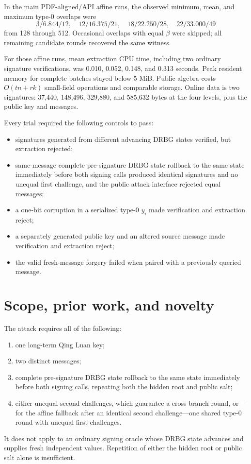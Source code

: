 \documentclass[11pt,a4paper]{article}
\begin{document}
In the main PDF-aligned/API affine runs, the observed minimum, mean, and maximum
type-0 overlaps were
\[
 3/6.844/12,\quad 12/16.375/21,\quad
 18/22.250/28,\quad 22/33.000/49
\]
from 128 through 512.  Occasional overlaps with equal $\beta$ were skipped; all
remaining candidate rounds recovered the same witness.

For those affine runs, mean extraction CPU time, including two ordinary
signature verifications, was
0.010, 0.052, 0.148, and 0.313 seconds.  Peak resident memory for complete
batches stayed below 5 MiB.  Public algebra costs
$O(tn+rk)$ small-field operations and comparable storage.  Online data is two
signatures: 37,440, 148,496, 329,880, and 585,632 bytes at the four levels,
plus the public key and messages.

Every trial required the following controls to pass:
\begin{itemize}[leftmargin=*,itemsep=2pt]
  \item signatures generated from different advancing DRBG states verified,
        but extraction rejected;
  \item same-message complete pre-signature DRBG state rollback to the same
        state immediately before both signing calls produced identical
        signatures and no unequal first challenge, and the public
        attack interface rejected equal messages;
  \item a one-bit corruption in a serialized type-0 $y_i$ made verification
        and extraction reject;
  \item a separately generated public key and an altered source message made
        verification and extraction reject;
  \item the valid fresh-message forgery failed when paired with a previously
        queried message.
\end{itemize}

\section{Scope, prior work, and novelty}

The attack requires all of the following:
\begin{enumerate}[leftmargin=*,itemsep=2pt]
  \item one long-term Qing Luan key;
  \item two distinct messages;
  \item complete pre-signature DRBG state rollback to the same state
        immediately before both signing calls, repeating both the hidden root
        and public salt;
  \item either unequal second challenges, which guarantee a cross-branch
        round, or---for the affine fallback after an identical second
        challenge---one shared type-0 round with unequal first challenges.
\end{enumerate}
It does not apply to an ordinary signing oracle whose DRBG state advances and
supplies fresh independent values.  Repetition of either the hidden root or
public salt alone is insufficient.
\end{document}
